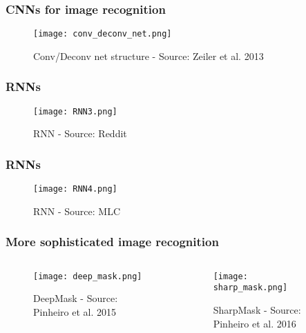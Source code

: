 \documentclass{beamer}
\begin{document}
\begin{frame}
	\frametitle{CNNs for image recognition}
    \begin{figure}
		\texttt{[image: conv\_deconv\_net.png]}
		\caption{Conv/Deconv net structure - Source: Zeiler et al. 2013}
	\end{figure}
\end{frame}

\begin{frame}
	\frametitle{RNNs}
    \begin{figure}
		\texttt{[image: RNN3.png]}
		\caption{RNN - Source: Reddit}
	\end{figure}
\end{frame}

\begin{frame}
	\frametitle{RNNs}
    \begin{figure}
		\texttt{[image: RNN4.png]}
		\caption{RNN - Source: MLC}
	\end{figure}
\end{frame}

\begin{frame}
	\frametitle{More sophisticated image recognition}
    \begin{columns}[T]
    \begin{column}{.5\textwidth}
    \begin{block}{}
    \begin{figure}
		\texttt{[image: deep\_mask.png]}
		\caption{DeepMask - Source: Pinheiro et al. 2015}
	\end{figure}
    \end{block}
    \end{column}
    \begin{column}{.5\textwidth}
    \begin{block}{}
    \begin{figure}
		\texttt{[image: sharp\_mask.png]}
		\caption{SharpMask - Source: Pinheiro et al. 2016}
	\end{figure}
    \end{block}
    \end{column}
    \end{columns}
\end{frame}
\end{document}
